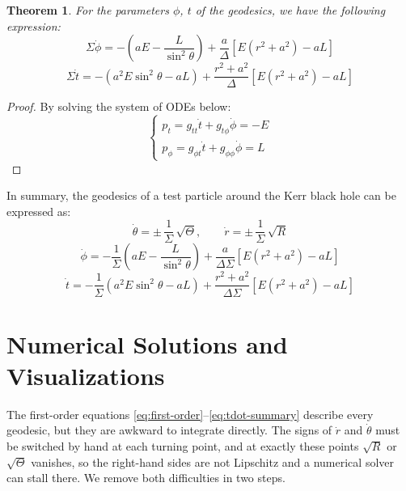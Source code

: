 \documentclass{article}
\newtheorem{theorem}{Theorem}[section]
\theoremstyle{remark}
\begin{document}
\begin{theorem}\label{thm:tphi}
    For the parameters $\phi$, $t$ of the geodesics, we have the following expression:
    \begin{equation}
        \Sigma\dot{\phi} = -(a E-\frac{L}{\sin^2\theta})+\frac{a}{\Delta}[E(r^2+a^2)-aL]
    \end{equation}    
    \begin{equation}
        \Sigma \dot{t} = -(a^2 E \sin^2\theta-aL) + \frac{r^2+a^2}{\Delta}[E(r^2+a^2)-aL]
    \end{equation}
\end{theorem}
\begin{proof}
By solving the system of ODEs below:
    \begin{equation}
        \begin{cases}
            p_t = g_{tt}\dot{t} +g_{t\phi}\dot{\phi} = -E \\
            p_\phi = g_{\phi t}\dot{t} + g_{\phi\phi}\dot{\phi} = L
        \end{cases}
    \end{equation}
\end{proof}

In summary, the geodesics of a test particle around the Kerr black hole can be expressed as:
\begin{equation}\label{eq:first-order}
    \dot{\theta} = \pm\,\frac{1}{\Sigma}\,\sqrt{\Theta},
\quad\quad
\dot{r} = \pm\,\frac{1}{\Sigma}\,\sqrt{R}
\end{equation}
\begin{equation}
    \dot{\phi} = -\frac{1}{\Sigma}(a E-\frac{L}{\sin^2\theta})+\frac{a}{\Delta\Sigma}[E(r^2+a^2)-aL]
\end{equation}
\begin{equation}\label{eq:tdot-summary}
    \dot{t} = -\frac{1}{\Sigma}(a^2 E \sin^2\theta-aL) + \frac{r^2+a^2}{\Delta\Sigma}[E(r^2+a^2)-aL]
\end{equation}

\section{Numerical Solutions and Visualizations}
The first-order equations \eqref{eq:first-order}--\eqref{eq:tdot-summary} describe every geodesic, but they are awkward to integrate directly. The signs of $\dot{r}$ and $\dot{\theta}$ must be switched by hand at each turning point, and at exactly these points $\sqrt{R}$ or $\sqrt{\Theta}$ vanishes, so the right-hand sides are not Lipschitz and a numerical solver can stall there. We remove both difficulties in two steps.
\end{document}
